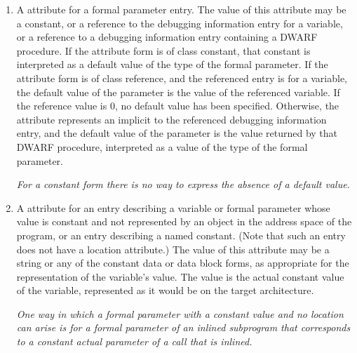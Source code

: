 \begin{enumerate}[1. ]
\item A \DWATdefaultvalue{} attribute 
for 
a formal parameter
\hypertarget{chap:DWATdefaultvaluedefaultvalueofparameter}{}
entry. The value of this attribute may be a constant, or a reference to the
debugging information entry for a variable, or a reference to a
debugging information entry containing a DWARF procedure.  If the
attribute form is of class constant, that constant is interpreted as
a default value of the type of the formal parameter. If the attribute
form is of class reference, and the referenced entry is for a
variable, the default value of the parameter is the value of the
referenced variable.  If the reference value is 0, no default value
has been specified.  Otherwise, the attribute represents an implicit
\DWOPcallref{} to the referenced debugging information entry, and
the default value of the parameter is the value returned by that
DWARF procedure, interpreted as a value of the type of the formal
parameter.

\textit{For a constant form there is no way to 
express the absence of a default value.}

\item A \DWATconstvalue{} attribute 
for 
\hypertarget{chap:DWATconstvalueconstantobject}{}
an entry describing a
variable or formal parameter whose value is constant and not
represented by an object in the address space of the program,
or an entry describing a named constant. (Note that such
an entry does not have a location attribute.) The value of
this attribute may be a string or any of the constant data
or data block forms, 
as appropriate for the representation
of the variable's value. The value is the actual constant
value of the variable, represented as it would be on the
target architecture.  

\textit{One way in which a formal parameter
with a constant value and no location can arise is for a
formal parameter of an inlined subprogram that corresponds
to a constant actual parameter of a call that is inlined.
}


\end{enumerate}
